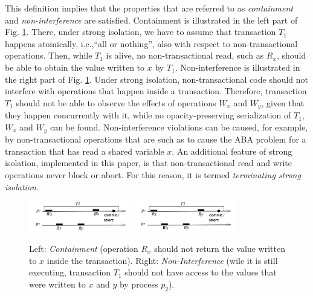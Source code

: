 This definition implies that the properties that are referred to  as  
{\it containment}  and {\it non-interference} \cite{blundell06} are satisfied.  
Containment is   illustrated in  the  left  part of  Fig.
\ref{fig:int-nonc}.  There,
under strong  isolation, we have  to assume that transaction  $T_1$ happens
atomically,  
i.e.,``all  or  nothing'',   also  with  respect  to  non-transactional
operations. Then, while $T_1$ is  alive, no non-transactional read, such as
$R_x$, should be  
able to obtain  the value written to $x$  by $T_1$. Non-interference
is  illustrated  in  the right part of Fig.  \ref{fig:int-nonc}.  
Under  strong  isolation, non-transactional  
code   should  not  interfere   with  operations   that  happen   inside  a
transaction. Therefore, transaction $T_1$ should not be able to observe the
effects of  operations $W_x$ and $W_y$, given that they happen concurrently with it, 
while no opacity-preserving serialization of $T_1$, $W_x$ and $W_y$ can be found. 
Non-interference violations can be caused, for example,  by non-transactional 
operations that are such as to cause the ABA problem for a transaction that has 
read a shared variable $x$.
An additional feature of strong isolation, implemented in this paper, 
is that non-transactional read and write operations never block or abort. 
For this reason, it is termed {\it terminating strong isolation}.

\begin{figure}[ht]
\centerline{
     \mbox{\includegraphics[width=0.4\textwidth]{SI/imgs/non_containment}}     
    \mbox{\includegraphics[width=0.4\textwidth]{SI/imgs/interference}}
}
\caption{Left:  {\it Containment}  (operation $R_x$  should not  return the
    value written to $x$ inside the transaction). 
Right:  {\it  Non-Interference} (wile  it is still  executing, transaction
$T_1$ should not have access to the values that were written to $x$ and $y$
by process $p_2$).} 
\label{fig:int-nonc}
\end{figure}


